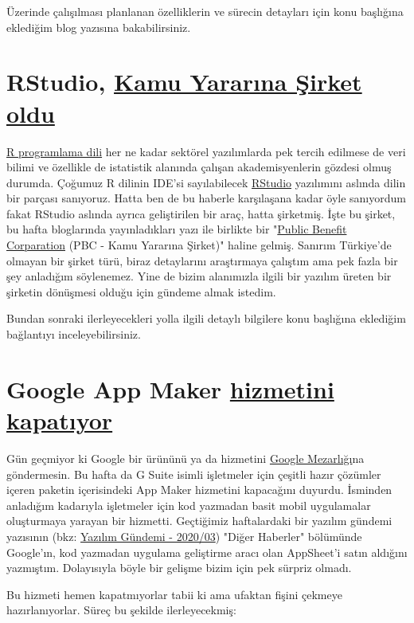 \documentclass[11pt]{article}
\begin{document}
Üzerinde çalışılması planlanan özelliklerin ve sürecin detayları için konu
başlığına eklediğim blog yazısına bakabilirsiniz.
\section{RStudio, \href{https://blog.rstudio.com/2020/01/29/rstudio-pbc/}{Kamu Yararına Şirket oldu}}
\label{sec:org1da847d}
\href{https://www.r-project.org/}{R programlama dili} her ne kadar sektörel yazılımlarda pek tercih edilmese de
veri bilimi ve özellikle de istatistik alanında çalışan akademisyenlerin
gözdesi olmuş durumda. Çoğumuz R dilinin IDE'si sayılabilecek \href{https://rstudio.com/}{RStudio}
yazılımını aslında dilin bir parçası sanıyoruz. Hatta ben de bu haberle
karşılaşana kadar öyle sanıyordum fakat RStudio aslında ayrıca geliştirilen
bir araç, hatta şirketmiş. İşte bu şirket, bu hafta bloglarında yayınladıkları
yazı ile birlikte bir "\href{https://en.wikipedia.org/wiki/Public-benefit\_corporation}{Public Benefit Corparation} (PBC - Kamu Yararına
Şirket)" haline gelmiş. Sanırım Türkiye'de olmayan bir şirket türü, biraz
detaylarını araştırmaya çalıştım ama pek fazla bir şey anladığım söylenemez.
Yine de bizim alanımızla ilgili bir yazılım üreten bir şirketin dönüşmesi
olduğu için gündeme almak istedim.

Bundan sonraki ilerleyecekleri yolla ilgili detaylı bilgilere konu başlığına
eklediğim bağlantıyı inceleyebilirsiniz.
\section{Google App Maker \href{https://support.google.com/a/answer/9682494?hl=en}{hizmetini kapatıyor}}
\label{sec:org47d2ae0}
Gün geçmiyor ki Google bir ürününü ya da hizmetini \href{https://killedbygoogle.com/}{Google Mezarlığı}na
göndermesin. Bu hafta da G Suite isimli işletmeler için çeşitli hazır çözümler
içeren paketin içerisindeki App Maker hizmetini kapacağını duyurdu. İsminden
anladığım kadarıyla işletmeler için kod yazmadan basit mobil uygulamalar
oluşturmaya yarayan bir hizmetti. Geçtiğimiz haftalardaki bir yazılım gündemi
yazısının (bkz: \href{../03/yazilim-gundemi-2020-03.pdf}{Yazılım Gündemi - 2020/03}) "Diğer Haberler" bölümünde
Google'ın, kod yazmadan uygulama geliştirme aracı olan AppSheet'i satın
aldığını yazmıştım. Dolayısıyla böyle bir gelişme bizim için pek sürpriz
olmadı.

Bu hizmeti hemen kapatmıyorlar tabii ki ama ufaktan fişini çekmeye
hazırlanıyorlar. Süreç bu şekilde ilerleyecekmiş:
\end{document}
